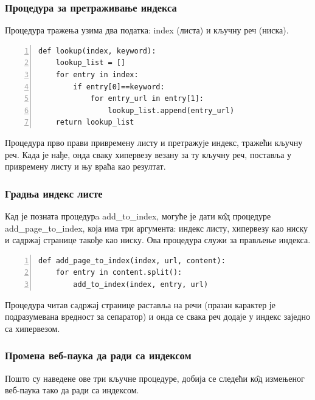 \subsubsection{Процедура за претраживање индекса}

Процедура тражења узима два податка: index (листа) и кључну реч (ниска).

\begin{lstlisting}[caption=Процедура lookup, label={lst:lookup}, numbers=left]
def lookup(index, keyword):
    lookup_list = []
    for entry in index:
        if entry[0]==keyword:
            for entry_url in entry[1]:
                lookup_list.append(entry_url)
    return lookup_list
		\end{lstlisting}

Процедура прво прави привремену листу и претражује индекс, тражећи кључну реч. Када је нађе, онда сваку хипервезу везану за ту кључну реч, поставља у привремену листу и њу враћа као резултат.


\subsubsection{Градња индекс листе}

Кад је позната процедурa add\_to\_index, могуће је дати к\^{о}д процедуре\\ add\_page\_to\_index, која има три аргумента: индекс листу, хипервезу као ниску и садржај странице такође као ниску. Ова процедура служи за прављење индекса.

\begin{lstlisting}[caption=Процедура add\_page\_to\_index , label={lst:addpagetoindex}, numbers=left]
def add_page_to_index(index, url, content):
    for entry in content.split():
        add_to_index(index, entry, url)
		\end{lstlisting}

Процедура читав садржај странице раставља на речи (празан карактер је подразумевана вредност за сепаратор) и онда се свака реч додаје у индекс заједно са хипервезом.

\subsubsection{Промена веб-паука да ради са индексом}

Пошто су наведене ове три кључне процедуре, добија се следећи к\^{о}д измењеног веб-паука тако да ради са индексом.

